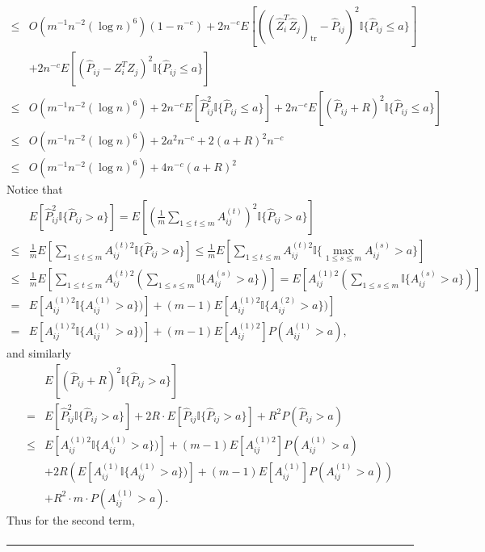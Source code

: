 \documentclass[a4paper]{article}
\newenvironment{proof}{{\bf Proof:  }}{\hfill\rule{2mm}{2mm}}
\begin{document}
\begin{proof}
\begin{align*}
	\le & O(m^{-1} n^{-2} (\log n)^6) (1 - n^{-c}) + 2 n^{-c} E[((\hat{Z}_i^T \hat{Z}_j)_{\mathrm{tr}} - \hat{P}_{ij})^2 \mathbb{I}\{\hat{P}_{ij} \le a\}] \\
	& + 2 n^{-c} E[(\hat{P}_{ij} - Z_i^T Z_j)^2 \mathbb{I}\{\hat{P}_{ij} \le a\}] \\
	\le & O(m^{-1} n^{-2} (\log n)^6) + 2 n^{-c} E[\hat{P}_{ij}^2 \mathbb{I}\{\hat{P}_{ij} \le a\}] + 2 n^{-c} E[(\hat{P}_{ij} + R)^2 \mathbb{I}\{\hat{P}_{ij} \le a\}] \\
	\le & O(m^{-1} n^{-2} (\log n)^6) + 2 a^2 n^{-c} + 2 (a+R)^2 n^{-c} \\
	\le & O(m^{-1} n^{-2} (\log n)^6) + 4 n^{-c} (a + R)^2
\end{align*}
Notice that
\begin{align*}
	& E[\hat{P}_{ij}^2 \mathbb{I} \{ \hat{P}_{ij} > a \}]
	= E[(\frac{1}{m} \sum_{1 \le t \le m} A_{ij}^{(t)})^2 \mathbb{I} \{ \hat{P}_{ij} > a \}] \\
	\le & \frac{1}{m} E[\sum_{1 \le t \le m} A_{ij}^{(t)2} \mathbb{I} \{ \hat{P}_{ij} > a \}]
	\le \frac{1}{m} E[\sum_{1 \le t \le m} A_{ij}^{(t)2} \mathbb{I} \{ \max_{1 \le s \le m} A_{ij}^{(s)} > a \}] \\
	\le & \frac{1}{m} E[\sum_{1 \le t \le m} A_{ij}^{(t)2} (\sum_{1 \le s \le m}\mathbb{I} \{ A_{ij}^{(s)} > a \})]
	= E[A_{ij}^{(1)2} (\sum_{1 \le s \le m}\mathbb{I} \{ A_{ij}^{(s)} > a \})] \\
	= & E[A_{ij}^{(1)2} \mathbb{I} \{ A_{ij}^{(1)} > a \})] + (m-1) E[A_{ij}^{(1)2} \mathbb{I} \{ A_{ij}^{(2)} > a \})] \\
	= & E[A_{ij}^{(1)2} \mathbb{I} \{ A_{ij}^{(1)} > a \})] + (m-1) E[A_{ij}^{(1)2}] P(A_{ij}^{(1)} > a),
\end{align*}
and similarly
\begin{align*}
	& E[(\hat{P}_{ij} + R)^2 \mathbb{I} \{ \hat{P}_{ij} > a \}] \\
	= & E[\hat{P}_{ij}^2 \mathbb{I} \{ \hat{P}_{ij} > a \}] + 2R \cdot E[\hat{P}_{ij} \mathbb{I} \{ \hat{P}_{ij} > a \}] + R^2 P(\hat{P}_{ij} > a) \\
	\le & E[A_{ij}^{(1)2} \mathbb{I} \{ A_{ij}^{(1)} > a \})] + (m-1) E[A_{ij}^{(1)2}] P(A_{ij}^{(1)} > a) \\
	& + 2R \left( E[A_{ij}^{(1)} \mathbb{I} \{ A_{ij}^{(1)} > a \})] + (m-1) E[A_{ij}^{(1)}] P(A_{ij}^{(1)} > a) \right) \\
	& + R^2 \cdot m \cdot P(A_{ij}^{(1)} > a).
\end{align*}
Thus for the second term,
\begin{align*}

\end{align*}
\end{proof}
\end{document}
